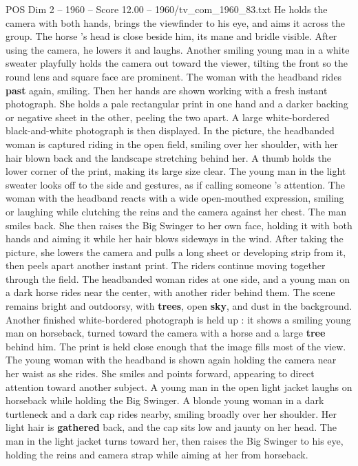 \begin{textsample}{POS Dim 2 – 1960 – Score 12.00 – 1960/tv\_com\_1960\_83.txt}
He holds the camera with both hands, brings the viewfinder to his eye, and aims it across the group.
The horse ’s head is close beside him, its mane and bridle visible.
After using the camera, he lowers it and laughs.
Another smiling young man in a white sweater playfully holds the camera out toward the viewer, tilting the front so the round lens and square face are prominent.
The woman with the headband rides \textbf{past} again, smiling.
Then her hands are shown working with a fresh instant photograph.
She holds a pale rectangular print in one hand and a darker backing or negative sheet in the other, peeling the two apart.
A large white-bordered black-and-white photograph is then displayed.
In the picture, the headbanded woman is captured riding in the open field, smiling over her shoulder, with her hair blown back and the landscape stretching behind her.
A thumb holds the lower corner of the print, making its large size clear.
The young man in the light sweater looks off to the side and gestures, as if calling someone ’s attention.
The woman with the headband reacts with a wide open-mouthed expression, smiling or laughing while clutching the reins and the camera against her chest.
The man smiles back.
She then raises the Big Swinger to her own face, holding it with both hands and aiming it while her hair blows sideways in the wind.
After taking the picture, she lowers the camera and pulls a long sheet or developing strip from it, then peels apart another instant print.
The riders continue moving together through the field.
The headbanded woman rides at one side, and a young man on a dark horse rides near the center, with another rider behind them.
The scene remains bright and outdoorsy, with \textbf{trees}, open \textbf{sky}, and dust in the background.
Another finished white-bordered photograph is held up : it shows a smiling young man on horseback, turned toward the camera with a horse and a large \textbf{tree} behind him.
The print is held close enough that the image fills most of the view.
The young woman with the headband is shown again holding the camera near her waist as she rides.
She smiles and points forward, appearing to direct attention toward another subject.
A young man in the open light jacket laughs on horseback while holding the Big Swinger.
A blonde young woman in a dark turtleneck and a dark cap rides nearby, smiling broadly over her shoulder.
Her light hair is \textbf{gathered} back, and the cap sits low and jaunty on her head.
The man in the light jacket turns toward her, then raises the Big Swinger to his eye, holding the reins and camera strap while aiming at her from horseback.

\end{textsample}
